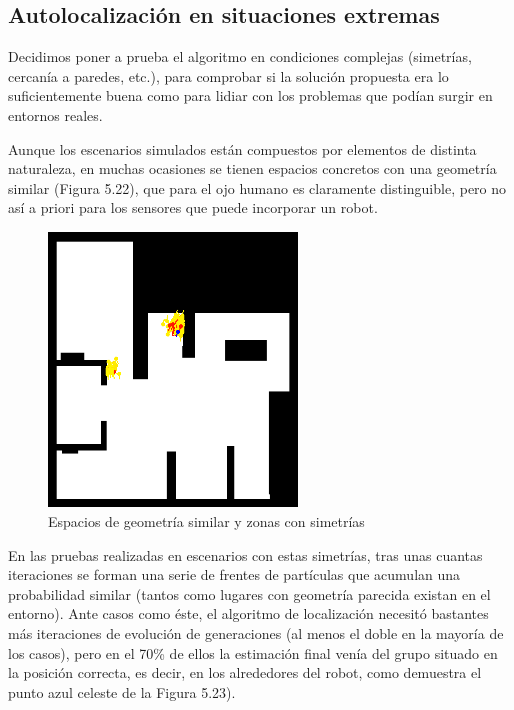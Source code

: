 \subsection{Autolocalización en situaciones extremas}
Decidimos poner a prueba el algoritmo en condiciones complejas (simetrías, cercanía a paredes, etc.), para comprobar si la solución propuesta era lo suficientemente buena como para lidiar con los problemas que podían surgir en entornos reales.

Aunque los escenarios simulados están compuestos por elementos de distinta naturaleza, en muchas ocasiones se tienen espacios concretos con una geometría similar (Figura 5.22), que para el ojo humano es claramente distinguible, pero no así a priori para los sensores que puede incorporar un robot.


\begin{figure}[H]
	\begin{center}
		\includegraphics[width=0.59\textwidth, ]{figures/similar.png}
		\caption{Espacios de geometría similar y zonas con simetrías}
		\label{fig.similar}
		\end{center}
\end{figure}
En las pruebas realizadas en escenarios con estas simetrías, tras unas cuantas iteraciones se forman una serie de frentes de partículas que acumulan una probabilidad similar (tantos como lugares con geometría parecida existan en el entorno). Ante casos como éste, el algoritmo de localización necesitó bastantes más iteraciones de evolución de generaciones (al menos el doble en la mayoría de los casos), pero en el 70\% de ellos la estimación final venía del grupo situado en la posición correcta, es decir, en los alrededores del robot, como demuestra el punto azul celeste de la Figura 5.23).

